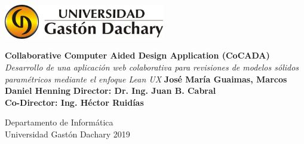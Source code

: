 

\thispagestyle{empty}
\begin{flushright}
\includegraphics[width=7cm]{Img/ugdlogo.jpg}
\end{flushright}	
\vskip40mm
\begin{center}
\huge\textbf{Collaborative Computer Aided Design Application (CoCADA)}
\vskip2mm
\large\textit{Desarrollo de una aplicación web colaborativa para revisiones de modelos sólidos paramétricos mediante el enfoque Lean UX}
\vskip5mm
\Large\textbf{José María Guaimas, Marcos Daniel Henning}
\vskip5mm
\Large\textbf{Director: Dr. Ing. Juan B. Cabral}\\
\Large\textbf{Co-Director: Ing. Héctor Ruidías}
\normalsize
\end{center}
\vfill
\begin{flushright}
\large
Departamento de Informática \\
Universidad Gastón Dachary 2019\\

\end{flushright}		


	




